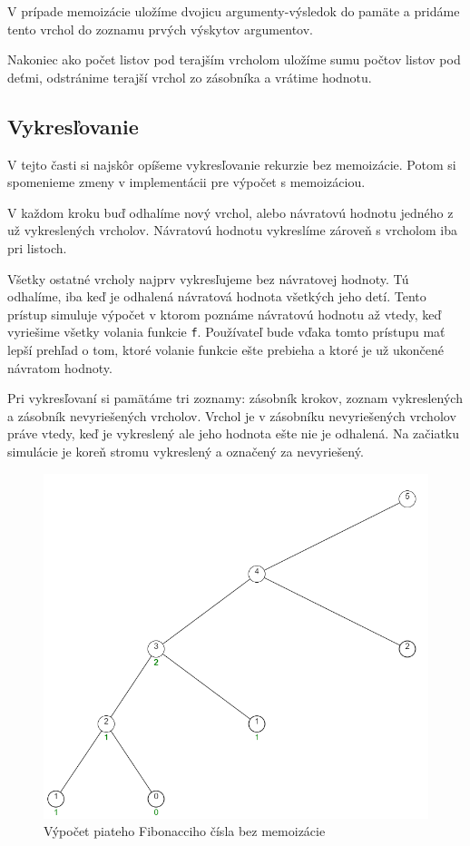 V prípade memoizácie uložíme dvojicu argumenty-výsledok do
pamäte a pridáme tento vrchol do zoznamu prvých výskytov argumentov.

Nakoniec ako počet listov pod terajším vrcholom uložíme sumu počtov listov pod deťmi,
odstránime terajší vrchol zo zásobníka a vrátime hodnotu.

\subsection{Vykresľovanie}
V tejto časti si najskôr opíšeme vykresľovanie rekurzie bez memoizácie. Potom
si spomenieme zmeny v implementácii pre výpočet s
memoizáciou.

V každom kroku buď odhalíme nový vrchol, alebo návratovú hodnotu jedného
z už vykreslených vrcholov. Návratovú hodnotu vykreslíme zároveň s vrcholom iba pri listoch.

Všetky ostatné vrcholy najprv vykresľujeme bez návratovej hodnoty. Tú odhalíme, iba keď
je odhalená návratová hodnota všetkých jeho detí. Tento prístup simuluje výpočet v ktorom
poznáme návratovú hodnotu až vtedy, keď vyriešime všetky volania funkcie \lstinline[language=Javascript]{f}.
Používateľ bude vďaka tomto prístupu mať lepší prehľad o tom, ktoré volanie funkcie ešte prebieha
a ktoré je už ukončené návratom hodnoty.

Pri vykresľovaní si pamätáme tri zoznamy: zásobník krokov, zoznam vykreslených a zásobník
nevyriešených vrcholov. Vrchol je v zásobníku nevyriešených vrcholov práve vtedy,
keď je vykreslený ale jeho hodnota ešte nie je odhalená. Na začiatku simulácie je
koreň stromu vykreslený a označený za nevyriešený.

\begin{figure}[h]
\includegraphics[width=\textwidth,height=\textheight,keepaspectratio]{images/bezMemo.png}
\caption{Výpočet piateho Fibonacciho čísla bez memoizácie}
\label{obr:memo}
\end{figure}


